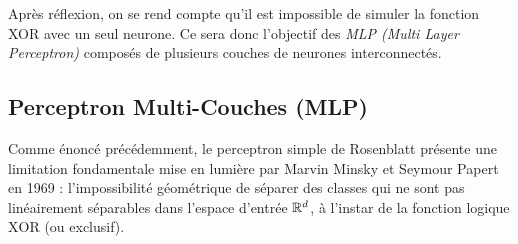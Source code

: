 \begin{figure}[h!]
\begin{minipage}{0.45\textwidth}
    \end{minipage}
\end{figure}

Après réflexion, on se rend compte qu'il est impossible de simuler la fonction XOR  avec un seul neurone. Ce sera donc l'objectif des \emph{MLP (Multi Layer Perceptron)}  composés de plusieurs couches de neurones interconnectés. 


\subsection{Perceptron Multi-Couches (MLP)}

Comme énoncé précédemment, le perceptron simple de Rosenblatt présente une limitation fondamentale mise en lumière par Marvin Minsky et Seymour Papert en 1969 : l'impossibilité géométrique de séparer des classes qui ne sont pas linéairement séparables dans l'espace d'entrée $\mathbb{R}^d$, à l'instar de la fonction logique $\mathrm{XOR}$ (ou exclusif).

